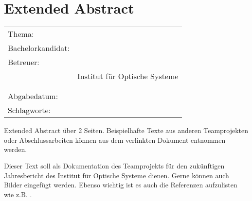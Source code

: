 \thispagestyle{plain}
\chapter*{Extended Abstract}
\label{ch:extended-abstract}

\begin{refsection}

\begin{center}
	\begin{tabular}{p{3.2cm}p{9.6cm}}
		Thema: & \thema \\[1ex]
		Bachelorkandidat: & \autor \\[1ex]
		Betreuer: & \prueferA \\
		 & Institut für Optische Systeme\\[1ex]
		 & \prueferB \\
		 & \firma \\[1ex]
		Abgabedatum: & \abgabedatum \\[1ex]
		Schlagworte: & \schlagworte \\[1ex]
	\end{tabular}
\end{center}

Extended Abstract über 2 Seiten. Beispielhafte Texte aus anderen Teamprojekten oder Abschlussarbeiten können aus dem verlinkten Dokument entnommen werden.

Dieser Text soll als Dokumentation des Teamprojekts für den zukünftigen Jahresbericht des Institut für Optische Systeme dienen. Gerne können auch Bilder eingefügt werden. Ebenso wichtig ist es auch die Referenzen aufzulisten wie z.B. \cite{rusu2011pcl}. %

\printbibliography[heading=subbibliography]

\end{refsection}
\newpage
